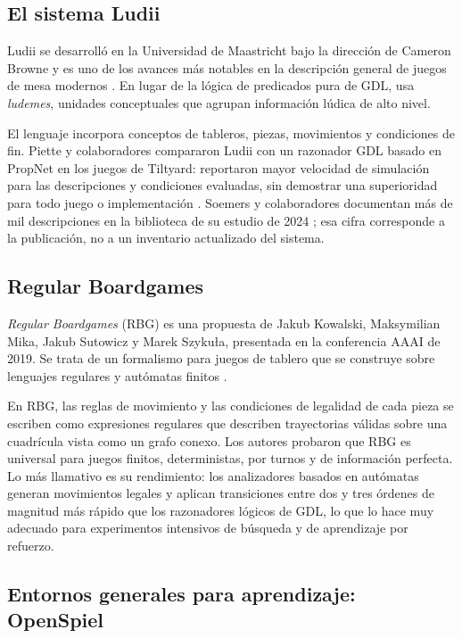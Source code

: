 \subsection{El sistema Ludii}

Ludii se desarrolló en la Universidad de Maastricht bajo la dirección de Cameron Browne y es uno de los avances más notables en la descripción general de juegos de mesa modernos \cite{Browne2020Ludii, Soemers2024Ludii}. En lugar de la lógica de predicados pura de GDL, usa \textit{ludemes}, unidades conceptuales que agrupan información lúdica de alto nivel.

El lenguaje incorpora conceptos de tableros, piezas, movimientos y condiciones de fin. Piette y colaboradores compararon Ludii con un razonador GDL basado en PropNet en los juegos de Tiltyard: reportaron mayor velocidad de simulación para las descripciones y condiciones evaluadas, sin demostrar una superioridad para todo juego o implementación \cite{Browne2020Ludii}. Soemers y colaboradores documentan más de mil descripciones en la biblioteca de su estudio de 2024 \cite{Soemers2024Ludii}; esa cifra corresponde a la publicación, no a un inventario actualizado del sistema.

\subsection{Regular Boardgames}

\textit{Regular Boardgames} (RBG) es una propuesta de Jakub Kowalski, Maksymilian Mika, Jakub Sutowicz y Marek Szykuła, presentada en la conferencia AAAI de 2019. Se trata de un formalismo para juegos de tablero que se construye sobre lenguajes regulares y autómatas finitos \cite{Kowalski2019RBG}.

En RBG, las reglas de movimiento y las condiciones de legalidad de cada pieza se escriben como expresiones regulares que describen trayectorias válidas sobre una cuadrícula vista como un grafo conexo. Los autores probaron que RBG es universal para juegos finitos, deterministas, por turnos y de información perfecta. Lo más llamativo es su rendimiento: los analizadores basados en autómatas generan movimientos legales y aplican transiciones entre dos y tres órdenes de magnitud más rápido que los razonadores lógicos de GDL, lo que lo hace muy adecuado para experimentos intensivos de búsqueda y de aprendizaje por refuerzo.

\subsection{Entornos generales para aprendizaje: OpenSpiel}

